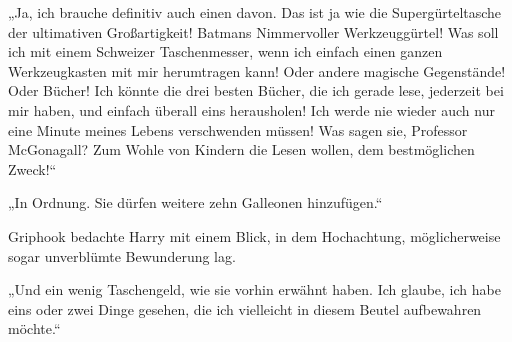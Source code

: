 „Ja, ich brauche definitiv auch einen davon. Das ist ja wie die Supergürteltasche der ultimativen Großartigkeit! Batmans Nimmervoller Werkzeuggürtel! Was soll ich mit einem Schweizer Taschenmesser, wenn ich einfach einen ganzen Werkzeugkasten mit mir herumtragen kann! Oder andere magische Gegenstände! Oder Bücher! Ich könnte die drei besten Bücher, die ich gerade lese, jederzeit bei mir haben, und einfach überall eins herausholen! Ich werde nie wieder auch nur eine Minute meines Lebens verschwenden müssen! Was sagen sie, Professor McGonagall? Zum Wohle von Kindern die Lesen wollen, dem bestmöglichen Zweck!“

„In Ordnung. Sie dürfen weitere zehn Galleonen hinzufügen.“

Griphook bedachte Harry mit einem Blick, in dem Hochachtung, möglicherweise sogar unverblümte Bewunderung lag.

„Und ein wenig Taschengeld, wie sie vorhin erwähnt haben. Ich glaube, ich habe eins oder zwei Dinge gesehen, die ich vielleicht in diesem Beutel aufbewahren möchte.“

